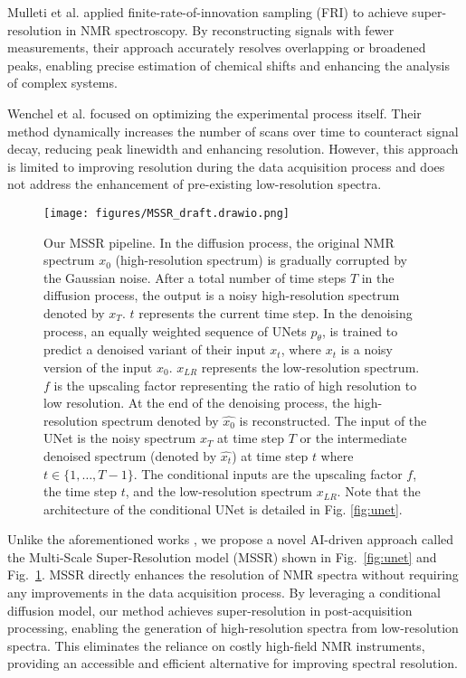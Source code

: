 Mulleti et al. \cite{mulleti2017super} applied finite-rate-of-innovation sampling (FRI) \cite{vetterli2002sampling} to achieve super-resolution in NMR spectroscopy. By reconstructing signals with fewer measurements, their approach accurately resolves overlapping or broadened peaks, enabling precise estimation of chemical shifts and enhancing the analysis of complex systems.

Wenchel et al. \cite{wenchel2024super} focused on optimizing the experimental process itself. Their method dynamically increases the number of scans over time to counteract signal decay, reducing peak linewidth and enhancing resolution. However, this approach is limited to improving resolution during the data acquisition process and does not address the enhancement of pre-existing low-resolution spectra.

\begin{figure*}[btp]
    \centering
    \texttt{[image: figures/MSSR\_draft.drawio.png]}
    \caption{Our MSSR pipeline. In the diffusion process, the original NMR spectrum $x_0$ (high-resolution spectrum) is gradually corrupted by the Gaussian noise. After a total number of time steps $T$ in the diffusion process, the output is a noisy high-resolution spectrum denoted by $x_T$. $t$ represents the current time step.
    In the denoising process, an equally weighted sequence of UNets $p_{\theta}$, is trained to predict a denoised variant of their input $x_t$, where $x_t$ is a noisy version of the input $x_0$. $x_{LR}$ represents the low-resolution spectrum. $f$ is the upscaling factor representing the ratio of high resolution to low resolution.  At the end of the denoising process, the high-resolution spectrum denoted by $\widehat{x_0}$ is reconstructed. 
    The input of the UNet is the noisy spectrum $x_T$ at time step $T$ or the intermediate denoised spectrum (denoted by $\widehat{x_t}$) at time step $t$ where $t \in \{1,\dots,T-1\}$. The conditional inputs are the upscaling factor $f$, the time step $t$, and the low-resolution spectrum $x_{LR}$.
    Note that the architecture of the conditional UNet is detailed in Fig. \ref{fig:unet}.
    }
    \label{mssr}
\end{figure*}

Unlike the aforementioned works \cite{mulleti2017super, wenchel2024super}, we propose a novel AI-driven approach called the Multi-Scale Super-Resolution model (MSSR) shown in Fig.~\ref{fig:unet} and Fig.~\ref{mssr}. MSSR directly enhances the resolution of NMR spectra without requiring any improvements in the data acquisition process. By leveraging a conditional diffusion model, our method achieves super-resolution in post-acquisition processing, enabling the generation of high-resolution spectra from low-resolution spectra. This eliminates the reliance on costly high-field NMR instruments, providing an accessible and efficient alternative for improving spectral resolution.